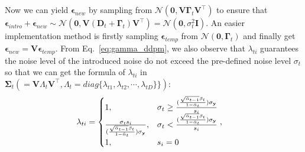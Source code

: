 \documentclass{article} \usepackage{iclr2023_conference,times}
\begin{document}
Now we can yield $\boldsymbol{\epsilon}_{new}$ by sampling from $\mathcal{N}(\mathbf{0}, \mathbf{V}\mathbf{\Gamma}_t\mathbf{V}^{\top})$ to ensure that $\boldsymbol{\epsilon}_{intro}+\boldsymbol{\epsilon}_{new}\sim\mathcal{N}(\mathbf{0}, \mathbf{V}(\mathbf{D}_t+\mathbf{\Gamma}_t)\mathbf{V}^{\top})=\mathcal{N}(\mathbf{0}, \sigma_t^2\mathbf{I})$. An easier implementation method is firstly sampling $\boldsymbol{\epsilon}_{temp}$ from $\mathcal{N}(\mathbf{0}, \mathbf{\Gamma}_t)$ and finally get $\boldsymbol{\epsilon}_{new}=\mathbf{V}\boldsymbol{\epsilon}_{temp}.$ From Eq.~\ref{eq:gamma_ddpm}, we also observe that $\lambda_{ti}$ guarantees the noise level of the introduced noise do not exceed the pre-defined noise level $\sigma_{t}$ so that we can get the formula of $\lambda_{ti}$ in $\mathbf{\Sigma}_t(=\mathbf{V}\Lambda_{t}\mathbf{V}^{\top}, \Lambda_{t}=diag\{\lambda_{t1}, \lambda_{t2}, \cdots, \lambda_{tD}\}\})$:
\begin{align}
    \lambda_{ti}&=\begin{cases}
        1, & \sigma_{t} \ge \frac{({\frac{\sqrt{\Bar{\alpha}_{t-1}}\beta_{t}}{1-\Bar{\alpha}_{t}}})\sigma_{\mathbf{y}}}{s_i}  \\
        \frac{\sigma_{t}s_i}{({\frac{\sqrt{\Bar{\alpha}_{t-1}}\beta_{t}}{1-\Bar{\alpha}_{t}}})\sigma_{\mathbf{y}}}, & \sigma_{t} < \frac{({\frac{\sqrt{\Bar{\alpha}_{t-1}}\beta_{t}}{1-\Bar{\alpha}_{t}}})\sigma_{\mathbf{y}}}{s_i} \\
        1, & s_i = 0
    \end{cases},
\end{align}
\end{document}

